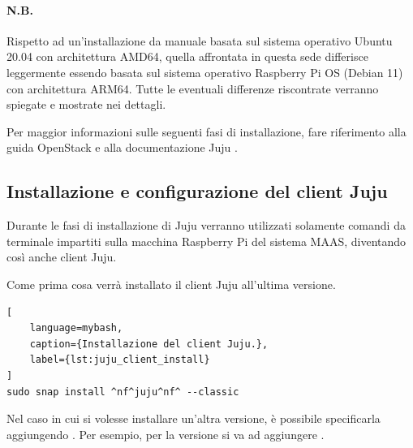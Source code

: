 \paragraph{N.B.} Rispetto ad un'installazione da manuale basata sul sistema operativo Ubuntu 20.04 con architettura AMD64, quella affrontata in questa sede differisce leggermente essendo basata sul sistema operativo Raspberry Pi OS (Debian 11) con architettura ARM64.
% 
Tutte le eventuali differenze riscontrate verranno spiegate e mostrate nei dettagli.

\bigskip\noindent
 Per maggior informazioni sulle seguenti fasi di installazione, fare riferimento alla guida OpenStack \cite{juju_install_openstack} e alla documentazione Juju \cite{juju_install_doc,juju_use_maas}. %
 
\subsection{Installazione e configurazione del client Juju}
Durante le fasi di installazione di Juju verranno utilizzati solamente comandi da terminale impartiti sulla macchina Raspberry Pi del sistema MAAS, diventando così anche client Juju.

\bigskip\noindent
Come prima cosa verrà installato il client Juju all'ultima versione. %
\begin{lstlisting}[
    language=mybash, 
    caption={Installazione del client Juju.}, 
    label={lst:juju_client_install}
]
sudo snap install ^nf^juju^nf^ --classic
\end{lstlisting}

Nel caso in cui si volesse installare un'altra versione, è possibile specificarla aggiungendo .
    Per esempio, per la versione  si va ad aggiungere .

